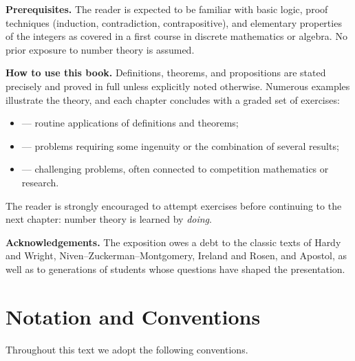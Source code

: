 \documentclass[12pt,a4paper,openany]{book}
\theoremstyle{definition}
\theoremstyle{plain}
\theoremstyle{remark}
\begin{document}
\medskip
\noindent\textbf{Prerequisites.}
The reader is expected to be familiar with basic logic, proof techniques
(induction, contradiction, contrapositive), and elementary properties of
the integers as covered in a first course in discrete mathematics or algebra.
No prior exposure to number theory is assumed.

\medskip
\noindent\textbf{How to use this book.}
Definitions, theorems, and propositions are stated precisely and proved in full
unless explicitly noted otherwise. Numerous examples illustrate the theory, and
each chapter concludes with a graded set of exercises:
\begin{itemize}[nosep]
  \item[$\star$] --- routine applications of definitions and theorems;
  \item[$\star\star$] --- problems requiring some ingenuity or the combination
        of several results;
  \item[$\star\star\star$] --- challenging problems, often connected to
        competition mathematics or research.
\end{itemize}
The reader is strongly encouraged to attempt exercises before continuing to the
next chapter: number theory is learned by \emph{doing}.

\medskip
\noindent\textbf{Acknowledgements.}
The exposition owes a debt to the classic texts of Hardy and Wright,
Niven--Zuckerman--Montgomery, Ireland and Rosen, and Apostol, as well as to
generations of students whose questions have shaped the presentation.

\chapter*{Notation and Conventions}


Throughout this text we adopt the following conventions.
\end{document}
